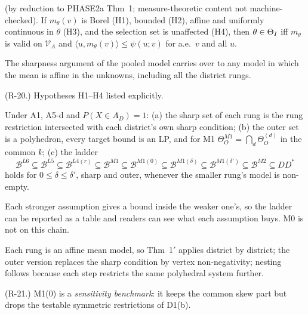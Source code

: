 \begin{result}\label{res:t1prime}
 (by reduction to PHASE2a Thm~1; measure-theoretic content not
machine-checked). If $m_\theta(v)$ is Borel (H1), bounded (H2), affine and
uniformly continuous in $\theta$ (H3), and the selection set is unaffected
(H4), then $\theta\in\Theta_I$ iff $m_\theta$ is valid on $\mathcal V_A$ and
$\langle u,m_\theta(v)\rangle\le\psi(u;v)$ for a.e.\ $v$ and all $u$.
\end{result}
\begin{plain}
The sharpness argument of the pooled model carries over to any model in which
the mean is affine in the unknowns, including all the district rungs.
\end{plain}
\begin{revnote}(R-20.) Hypotheses H1--H4 listed explicitly.\end{revnote}

\begin{result}\label{res:t2}
 Under A1, A5-d and $P(X\in A_D)=1$: (a) the sharp set of each rung
is the rung restriction intersected with each district's own sharp condition;
(b) the outer set is a polyhedron, every target bound is an LP, and for M1
$\Theta^{M1}_O=\bigcap_d\Theta^{(d)}_O$ in the common $k$; (c) the ladder
\[
\mathcal B^{L6}\subseteq\mathcal B^{L5}\subseteq\mathcal B^{L4(r)}\subseteq\mathcal B^{M1}\subseteq\mathcal B^{M1(0)}\subseteq\mathcal B^{M1(\delta)}\subseteq\mathcal B^{M1(\delta')}\subseteq\mathcal B^{M2}\subseteq DD^*
\]
holds for $0\le\delta\le\delta'$, sharp and outer, whenever the smaller rung's
model is non-empty.
\end{result}
\begin{plain}
Each stronger assumption gives a bound inside the weaker one's, so the ladder can
be reported as a table and readers can see what each assumption buys. M0 is not
on this chain.
\end{plain}
\begin{sketch}
Each rung is an affine mean model, so Thm~1$'$ applies district by district;
the outer version replaces the sharp condition by vertex non-negativity;
nesting follows because each step restricts the same polyhedral system further.
\end{sketch}
\begin{revnote}
(R-21.) M1(0) is a \emph{sensitivity benchmark}: it keeps the common skew part
but drops the testable symmetric restrictions of D1(b).
\end{revnote}

